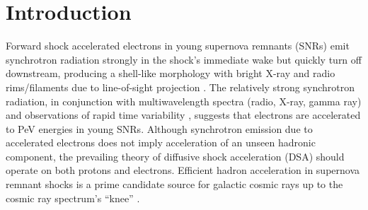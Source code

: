\documentclass[iop, apj, numberedappendix]{emulateapj}
\begin{document}


\section{Introduction} \label{sec:intro}

Forward shock accelerated electrons in young supernova remnants (SNRs) emit
synchrotron radiation strongly in the shock's immediate wake but quickly turn
off downstream, producing a shell-like morphology with bright X-ray and radio
rims/filaments due to line-of-sight projection \citep{koyama1995}.  The
relatively strong synchrotron radiation, in conjunction with multiwavelength
spectra (radio, X-ray, gamma ray) \citep{aharonian2004, acero2010,
ackermann2013} and observations of rapid time variability \citep{uchiyama2007},
suggests that electrons are accelerated to PeV energies in young SNRs.
Although synchrotron emission due to accelerated electrons does not imply
acceleration of an unseen hadronic component, the prevailing theory of
diffusive shock acceleration (DSA) should operate on both protons and
electrons.  Efficient hadron acceleration in supernova remnant shocks is a
prime candidate source for galactic cosmic rays up to the cosmic ray spectrum's
``knee'' \citep{vink2012}.
\end{document}
